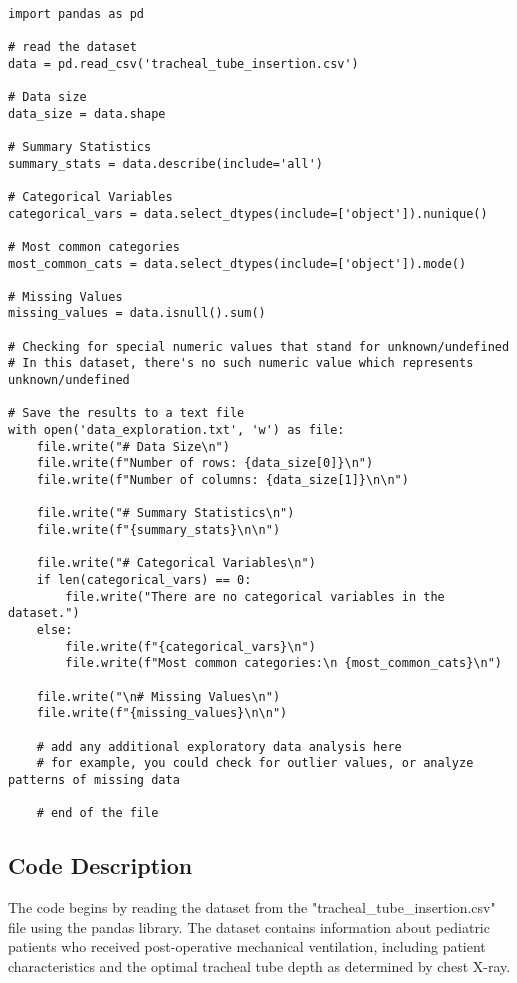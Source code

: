 \documentclass[11pt]{article}
\begin{document}
\begin{verbatim}

import pandas as pd

# read the dataset
data = pd.read_csv('tracheal_tube_insertion.csv')

# Data size
data_size = data.shape

# Summary Statistics
summary_stats = data.describe(include='all')

# Categorical Variables
categorical_vars = data.select_dtypes(include=['object']).nunique()

# Most common categories
most_common_cats = data.select_dtypes(include=['object']).mode()

# Missing Values
missing_values = data.isnull().sum()

# Checking for special numeric values that stand for unknown/undefined
# In this dataset, there's no such numeric value which represents unknown/undefined

# Save the results to a text file
with open('data_exploration.txt', 'w') as file:
    file.write("# Data Size\n")
    file.write(f"Number of rows: {data_size[0]}\n")
    file.write(f"Number of columns: {data_size[1]}\n\n")
    
    file.write("# Summary Statistics\n")
    file.write(f"{summary_stats}\n\n")
    
    file.write("# Categorical Variables\n")
    if len(categorical_vars) == 0:
        file.write("There are no categorical variables in the dataset.")
    else:
        file.write(f"{categorical_vars}\n")
        file.write(f"Most common categories:\n {most_common_cats}\n")
        
    file.write("\n# Missing Values\n")
    file.write(f"{missing_values}\n\n")

    # add any additional exploratory data analysis here
    # for example, you could check for outlier values, or analyze patterns of missing data

    # end of the file

\end{verbatim}

\subsection{Code Description}

The code begins by reading the dataset from the "tracheal\_tube\_insertion.csv" file using the pandas library. The dataset contains information about pediatric patients who received post-operative mechanical ventilation, including patient characteristics and the optimal tracheal tube depth as determined by chest X-ray.
\end{document}
